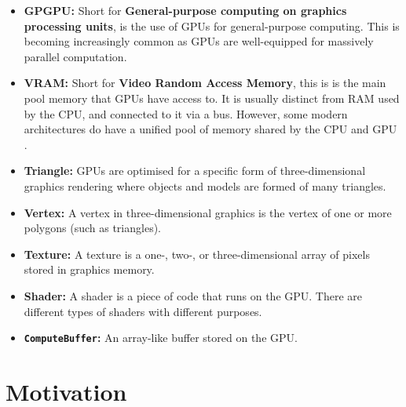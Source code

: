 \documentclass[12pt,a4paper,twoside]{report}
\begin{document}
\begin{itemize}
  \item \textbf{GPGPU:} Short for \textbf{General-purpose computing on graphics
  processing units}, is the use of GPUs for general-purpose computing. This is
  becoming increasingly common as GPUs are well-equipped for massively parallel
  computation.

  \item \textbf{VRAM:} Short for \textbf{Video Random Access Memory}, this is
  is the main pool memory that GPUs have access to. It is usually distinct from
  RAM used by the CPU, and connected to it via a bus. However, some modern
  architectures do have a unified pool of memory shared by the CPU and GPU
  \cite{AMDHuma}.

  \item \textbf{Triangle:} GPUs are optimised for a specific form of
  three-dimensional graphics rendering where objects and models are formed of
  many triangles.

  \item \textbf{Vertex:} A vertex in three-dimensional graphics is the vertex
  of one or more polygons (such as triangles).

  \item \textbf{Texture:} A texture is a one-, two-, or three-dimensional array
  of pixels stored in graphics memory.

  \item \textbf{Shader:} A shader is a piece of code that runs on the GPU. There
  are different types of shaders with different purposes.

  \item \textbf{\texttt{ComputeBuffer}:} An array-like buffer stored on the GPU.

\end{itemize}

\section{Motivation}

\end{document}
